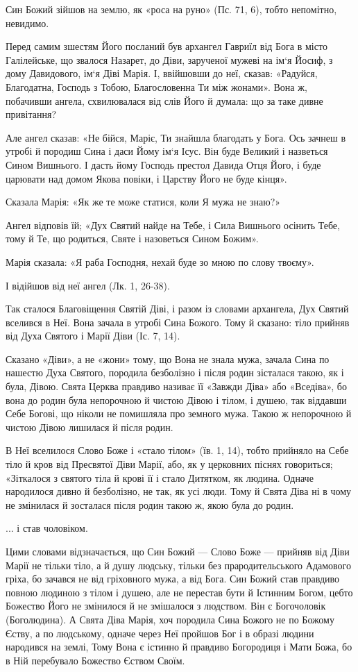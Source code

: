 \documentclass[main.tex]{subfiles}
\begin{document}
Син Божий зійшов на землю, як «роса на руно» (Пс. 71, 6), тобто непомітно, невидимо.

Перед самим зшестям Його посланий був архангел Гавриїл від Бога в місто Галілейське, що звалося Назарет, до Діви, зарученої мужеві на ім`я Йосиф, з дому Давидового, ім`я Діві Марія. І, ввійшовши до неї, сказав: «Радуйся, Благодатна, Господь з Тобою, Благословенна Ти між жонами». Вона ж, побачивши ангела, схвилювалася від слів Його й думала: що за таке дивне привітання?

Але ангел сказав: «Не бійся, Маріє, Ти знайшла благодать у Бога. Ось зачнеш в утробі й породиш Сина і даси Йому ім`я Ісус. Він буде Великий і назветься Сином Вишнього. І дасть йому Господь престол Давида Отця Його, і буде царювати над домом Якова повіки, і Царству Його не буде кінця».
 
Сказала Марія: «Як же те може статися, коли Я мужа не знаю?»

Ангел відповів їй; «Дух Святий найде на Тебе, і Сила Вишнього осінить Тебе, тому й Те, що родиться, Святе і назоветься Сином Божим».

Марія сказала: «Я раба Господня, нехай буде зо мною по слову твоєму».

І відійшов від неї ангел (Лк. 1, 26-38).

Так сталося Благовіщення Святій Діві, і разом із словами архангела, Дух Святий вселився в Неї. Вона зачала в утробі Сина Божого. Тому й сказано: тіло прийняв від Духа Святого і Марії Діви (Іс. 7, 14).

Сказано «Діви», а не «жони» тому, що Вона не знала мужа, зачала Сина по нашестю Духа Святого, породила безболізно і після родин зісталася такою, як і була, Дівою. Свята Церква правдиво називає її «Завжди Діва» або «Вседіва», бо вона до родин була непорочною й чистою Дівою і тілом, і душею, так віддавши Себе Богові, що ніколи не помишляла про земного мужа. Такою ж непорочною й чистою Дівою лишилася й після родин.

В Неї вселилося Слово Боже і «стало тілом» (їв. 1, 14), тобто прийняло на Себе тіло й кров від Пресвятої Діви Марії, або, як у церковних піснях говориться; «Зіткалося з святого тіла й крові її і стало Дитятком, як людина. Одначе народилося дивно й безболізно, не так, як усі люди. Тому й Свята Діва ні в чому не змінилася й зосталася після родин такою ж, якою була до родин.

... і став чоловіком.

Цими словами відзначається, що Син Божий — Слово Боже — прийняв від Діви Марії не тільки тіло, а й душу людську, тільки без прародительського Адамового гріха, бо зачався не від гріховного мужа, а від Бога. Син Божий став правдиво повною людиною з тілом і душею, але не перестав бути й Істинним Богом, цебто Божество Його не змінилося й не змішалося з людством. Він є Богочоловік (Боголюдина). А Свята Діва Марія, хоч породила Сина Божого не по Божому Єству, а по людському, одначе через Неї пройшов Бог і в образі людини народився на землі, Тому Вона є істинно й правдиво Богородиця і Мати Божа, бо в Ній перебувало Божество Єством Своїм.
 
\end{document}
